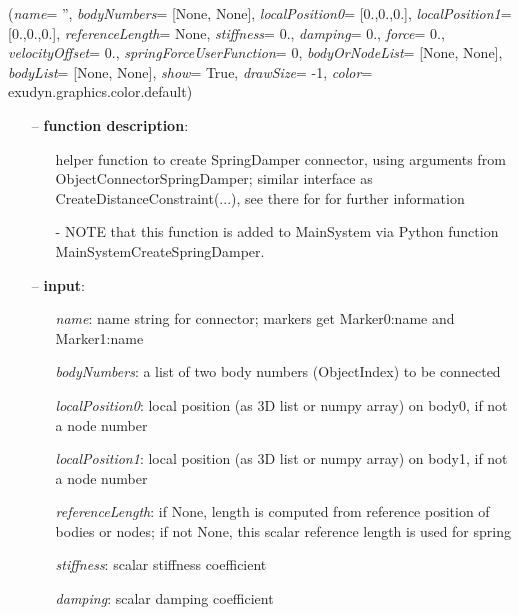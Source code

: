 %
\begin{flushleft}
\label{sec:mainsystemextensions:CreateSpringDamper}
({\it name}= '', {\it bodyNumbers}= [None, None], {\it localPosition0}= [0.,0.,0.], {\it localPosition1}= [0.,0.,0.], {\it referenceLength}= None, {\it stiffness}= 0., {\it damping}= 0., {\it force}= 0., {\it velocityOffset}= 0., {\it springForceUserFunction}= 0, {\it bodyOrNodeList}= [None, None], {\it bodyList}= [None, None], {\it show}= True, {\it drawSize}= -1, {\it color}= exudyn.graphics.color.default)
\end{flushleft}
\setlength{\itemindent}{0.7cm}
\begin{itemize}[leftmargin=0.7cm]
\item[--]
{\bf function description}: \vspace{-6pt}
\begin{itemize}[leftmargin=1.2cm]
\setlength{\itemindent}{-0.7cm}
\item[]helper function to create SpringDamper connector, using arguments from ObjectConnectorSpringDamper; similar interface as CreateDistanceConstraint(...), see there for for further information
\item[]- NOTE that this function is added to MainSystem via Python function MainSystemCreateSpringDamper.
\end{itemize}
\item[--]
{\bf input}: \vspace{-6pt}
\begin{itemize}[leftmargin=1.2cm]
\setlength{\itemindent}{-0.7cm}
\item[]{\it name}: name string for connector; markers get Marker0:name and Marker1:name
\item[]{\it bodyNumbers}: a list of two body numbers (ObjectIndex) to be connected
\item[]{\it localPosition0}: local position (as 3D list or numpy array) on body0, if not a node number
\item[]{\it localPosition1}: local position (as 3D list or numpy array) on body1, if not a node number
\item[]{\it referenceLength}: if None, length is computed from reference position of bodies or nodes; if not None, this scalar reference length is used for spring
\item[]{\it stiffness}: scalar stiffness coefficient
\item[]{\it damping}: scalar damping coefficient

\end{itemize}
\end{itemize}
